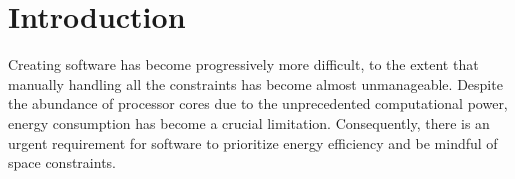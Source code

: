\section{Introduction}

Creating software has become progressively more difficult, to the extent that manually handling all the constraints has become almost unmanageable.
Despite the abundance of processor cores due to the unprecedented computational power, energy consumption has become a crucial limitation.
Consequently, there is an urgent requirement for software to prioritize energy efficiency and be mindful of space constraints.